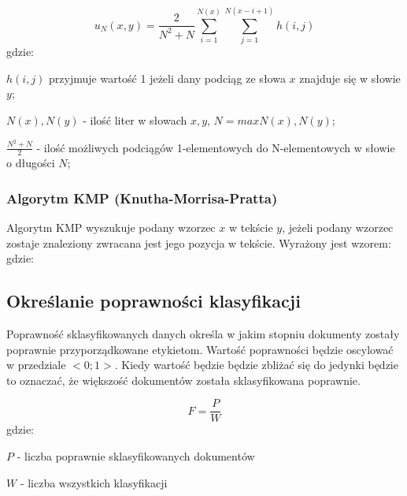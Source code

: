 \documentclass{classrep}
\begin{document}
\begin{equation}
    u_{N}(x, y)=\frac{2}{N^{2}+N}\sum_{i=1}^{N(x)}\sum_{j=1}^{N(x-i+1)}h(i,j)
\end{equation}
gdzie:\\
\begin{description}
    \item $h(i,j)$ przyjmuje wartość 1 jeżeli dany podciąg ze słowa $x$ znajduje się w słowie $y$;
    \item $N(x),N(y)$ - ilość liter w słowach $x, y$, $N=max{N(x),N(y)}$;
    \item $\frac{N^{2}+N}{2}$ - ilość możliwych podciągów 1-elementowych do N-elementowych w słowie o długości $N$;
\end{description}

\subsubsection{Algorytm KMP (Knutha-Morrisa-Pratta)}
Algorytm KMP wyszukuje podany wzorzec $x$ w tekście $y$, jeżeli podany wzorzec zostaje znaleziony zwracana jest jego
pozycja w tekście. Wyrażony jest wzorem:
\begin{equation}

\end{equation}
gdzie:\\
\begin{description}
    \item
    \item
    \item
\end{description}

\subsection{Określanie poprawności klasyfikacji}
Poprawność sklasyfikowanych danych określa w jakim stopniu dokumenty zostały poprawnie przyporządkowane etykietom.
Wartość poprawności będzie oscylować w przedziale $<0;1>$. Kiedy wartość będzie będzie zbliżać się do jedynki będzie
to oznaczać, że większość dokumentów została sklasyfikowana poprawnie.

\begin{equation}
    F=\frac{P}{W}
\end{equation}
gdzie:\\
\begin{description}
    \item $P$ - liczba poprawnie sklasyfikowanych dokumentów
    \item $W$ - liczba wszystkich klasyfikacji
\end{description}
\end{document}
